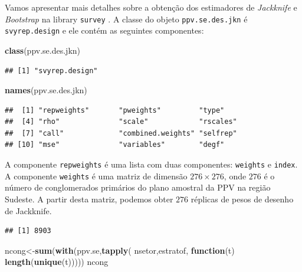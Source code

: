 \documentclass[]{book}
\newenvironment{Shaded}{\begin{snugshade}}{\end{snugshade}}
\newcommand{\KeywordTok}[1]{\textcolor[rgb]{0.13,0.29,0.53}{\textbf{#1}}}
\newcommand{\ControlFlowTok}[1]{\textcolor[rgb]{0.13,0.29,0.53}{\textbf{#1}}}
\newcommand{\OperatorTok}[1]{\textcolor[rgb]{0.81,0.36,0.00}{\textbf{#1}}}
\newcommand{\NormalTok}[1]{#1}
\theoremstyle{definition}
\theoremstyle{definition}
\theoremstyle{definition}
\theoremstyle{remark}
\begin{document}
Vamos apresentar mais detalhes sobre a obtenção dos estimadores de
\emph{Jackknife} e \emph{Bootstrap} na library \texttt{survey}
\citep{R-survey}. A classe do objeto \texttt{ppv.se.des.jkn} é
\texttt{svyrep.design} e ele contém as seguintes componentes:

\begin{Shaded}
\begin{Highlighting}[]
\KeywordTok{class}\NormalTok{(ppv.se.des.jkn)}
\end{Highlighting}
\end{Shaded}

\begin{verbatim}
## [1] "svyrep.design"
\end{verbatim}

\begin{Shaded}
\begin{Highlighting}[]
\KeywordTok{names}\NormalTok{(ppv.se.des.jkn)}
\end{Highlighting}
\end{Shaded}

\begin{verbatim}
##  [1] "repweights"       "pweights"         "type"            
##  [4] "rho"              "scale"            "rscales"         
##  [7] "call"             "combined.weights" "selfrep"         
## [10] "mse"              "variables"        "degf"
\end{verbatim}

A componente \texttt{repweights} é uma lista com duas componentes:
\texttt{weights} e \texttt{index}. A componente \texttt{weights} é uma
matriz de dimensão \(276 \times 276\), onde \(276\) é o número de
conglomerados primários do plano amostral da PPV na região Sudeste. A
partir desta matriz, podemos obter \(276\) réplicas de pesos de desenho
de Jackknife.

\begin{Shaded}
\end{Shaded}

\begin{verbatim}
## [1] 8903
\end{verbatim}

\begin{Shaded}
\begin{Highlighting}[]
\NormalTok{ncong<-}\KeywordTok{sum}\NormalTok{(}\KeywordTok{with}\NormalTok{(ppv.se,}\KeywordTok{tapply}\NormalTok{( nsetor,estratof, }\ControlFlowTok{function}\NormalTok{(t) }\KeywordTok{length}\NormalTok{(}\KeywordTok{unique}\NormalTok{(t)))))}
\NormalTok{ncong}
\end{Highlighting}
\end{Shaded}
\end{document}
